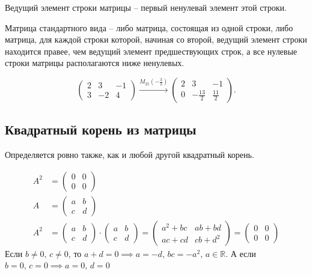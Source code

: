\documentclass[12pt, a4paper]{article}
\begin{document}
    \begin{definition}
        Ведущий элемент строки матрицы -- первый ненулевай элемент этой строки.
    \end{definition}
    \begin{definition}
        Матрица стандартного вида -- либо матрица, состоящая из одной строки, либо матрица, для каждой строки которой, начиная со второй, ведущий элемент строки находится правее, чем ведущий элемент предшествующих строк, а все нулевые строки матрицы располагаются ниже ненулевых.
    \end{definition}
    \begin{exmp}
        \[
            \begin{pmatrix} 2 & 3 & -1 \\ 3 & -2 & 4 \end{pmatrix} \xrightarrow{M_{21}\left( -\frac{3}{2} \right) } \begin{pmatrix} 2 & 3 & -1 \\ 0 & -\frac{13}{2} & \frac{11}{2} \end{pmatrix}.
        \] 
    \end{exmp}
    \subsection{Квадратный корень из матрицы}
    Определяется ровно также, как и любой другой квадратный корень.
    \begin{exmp}
        \begin{align*}
            A^2 &= \begin{pmatrix} 0 & 0 \\ 0 & 0\end{pmatrix} \\
            A &= \begin{pmatrix} a & b \\ c & d \end{pmatrix}  \\
            A^2 &= \begin{pmatrix} a & b \\ c & d \end{pmatrix} \cdot \begin{pmatrix} a & b \\ c & d \end{pmatrix} = \begin{pmatrix} a^2 + bc & ab + bd \\ ac + cd & cb + d^2 \end{pmatrix} = \begin{pmatrix} 0 & 0 \\ 0 &0 \end{pmatrix} 
        \end{align*}
        Если \( b \neq 0, \, c \neq 0 \), то \( a + d = 0 \implies a = -d \), \( bc = -a^2, \, a \in \mathbb{R} \). А если \( b = 0, \, c = 0 \implies a = 0, \, d = 0 \)
        
    \end{exmp}
\end{document}
